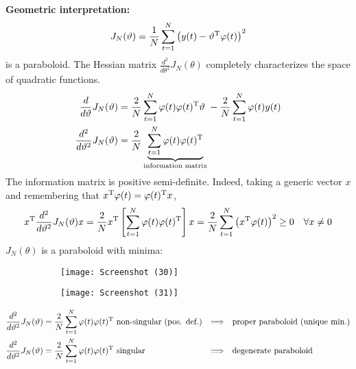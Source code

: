 \textbf{Geometric interpretation:}
\begin{equation*}
J_{N}(\vartheta) =\frac{1}{N}\sum _{t=1}^{N}\left(y(t) -\vartheta ^{\mathrm{T}} \varphi (t)\right)^{2}
\end{equation*}
is a paraboloid. The Hessian matrix $ \frac{d^{2}}{d\theta ^{2}} J_{N}(\theta)$ completely characterizes the space of quadratic functions.
\begin{align*}
\frac{d}{d\vartheta } J_{N}(\vartheta) & =\frac{2}{N}\sum _{t=1}^{N} \varphi (t) \varphi (t)^{\mathrm{T}} \vartheta \ -\frac{2}{N}\sum _{t=1}^{N} \varphi (t) y(t)\\
\frac{d^{2}}{d\vartheta ^{2}} J_{N}(\vartheta) & =\frac{2}{N}\underbrace{\sum _{t=1}^{N} \varphi (t) \varphi (t)^{\mathrm{T}}}_{\text{information matrix}}
\end{align*}
The information matrix is positive semi-definite. Indeed, taking a generic vector $x$ and remembering that $x^{\mathrm{T}} \varphi (t) =\varphi (t)^{\mathrm{T}} x$,
\[
	x^{\mathrm{T}}\frac{d^{2}}{d\vartheta ^{2}} J_{N}(\vartheta) x = \frac{2}{N} x^{\mathrm{T}}\left[\sum _{t=1}^{N} \varphi (t) \varphi (t)^{\mathrm{T}}\right] x=\frac{2}{N}\sum _{t=1}^{N}\left(x^{\mathrm{T}} \varphi (t)\right)^{2} \geq 0 \quad \forall x\neq 0
\]
$ J_{N}(\theta)$ is a paraboloid with minima:
\begin{figure}[htpb]
	\centering
	\begin{subfigure}{.5\textwidth}
		\centering
		\texttt{[image: Screenshot (30)]}
		\label{fig:test1}
	\end{subfigure}%
	\begin{subfigure}{.5\textwidth}
		\centering
		\texttt{[image: Screenshot (31)]}
		\label{fig:test2}
	\end{subfigure}
\end{figure}
\FloatBarrier
\begin{align*}
\frac{d^{2}}{d\vartheta ^{2}} J_{N}(\vartheta) & =\frac{2}{N}\sum _{t=1}^{N} \varphi (t) \varphi (t)^{\mathrm{T}} \text{ non-singular (pos. def.)} & \Longrightarrow\quad& \text{proper paraboloid (unique min.)}\\
\frac{d^{2}}{d\vartheta ^{2}} J_{N}(\vartheta) & =\frac{2}{N}\sum _{t=1}^{N} \varphi (t) \varphi (t)^{\mathrm{T}} \text{ singular} &\Longrightarrow\quad& \text{degenerate paraboloid}
\end{align*}